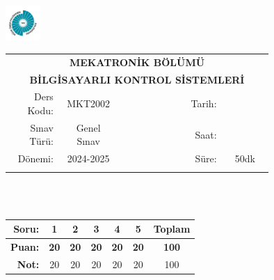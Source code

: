 \newcommand\UniversiteAdi{Niğde Ömer Halisdemir Üniversitesi}
\newcommand\BolumAdi{MEKATRONİK BÖLÜMÜ}
\newcommand\DersKodu{MKT2002}
\newcommand\DersAdi{BİLGİSAYARLI KONTROL SİSTEMLERİ}
\newcommand\SinavAdi{Genel Sınav}
\newcommand\SinavTarihi{ }
\newcommand\SinavSaati{ }
\newcommand\SinavSuresi{50dk}

\pagestyle{fancy}
\fancyhf{} %
\noindent \includegraphics[width=0.1\textwidth]{logo}
\begin{tabular}{
		p{0.15\linewidth}
		p{0.15\linewidth}
		p{0.2\linewidth}
		p{0.1\linewidth}
		p{0.15\linewidth}}
	\multicolumn{5}{c}{\textbf{\BolumAdi}}        \\
	\multicolumn{5}{c}{\textbf{\DersAdi}}         \\\hline
	\multicolumn{1}{|r|}{Ders Kodu:}  &
	\multicolumn{1}{|c|}{\DersKodu}   &
	\multicolumn{1}{|c|}{}            &
	\multicolumn{1}{|r|}{Tarih:}      &
	\multicolumn{1}{|c|}{\SinavTarihi}            \\\hline
	\multicolumn{1}{|r|}{Sınav Türü:} &
	\multicolumn{1}{|c|}{\SinavAdi}   &
	\multicolumn{1}{|c|}{}            &
	\multicolumn{1}{|r|}{Saat:}       &
	\multicolumn{1}{|c|}{\SinavSaati}             \\\hline
	\multicolumn{1}{|r|}{Dönemi:}     &
	\multicolumn{1}{|c|}{2024-2025}   &
	\multicolumn{1}{|c|}{}            &
	\multicolumn{1}{|r|}{Süre:}       &
	\multicolumn{1}{|c|}{\SinavSuresi}            \\\hline
	                                  &   &  &  & \\
\end{tabular}\\\\
\noindent\begin{center}
	\begin{tabular}{|r|c|c|c|c|c|c|}\hline
		\textbf{Soru:} &
		\textbf{1}     &
		\textbf{2}     &
		\textbf{3}     &
		\textbf{4}     &
		\textbf{5}     &
		\textbf{Toplam}                  \\\hline
		\textbf{Puan:} &
		\textbf{20}    &
		\textbf{20}    &
		\textbf{20}    &
		\textbf{20}    &
		\textbf{20}    &
		\textbf{100}                     \\\hline
		\textbf{Not:}  & 20&20&20&20&  20& 100\\\hline
	\end{tabular}\end{center}
